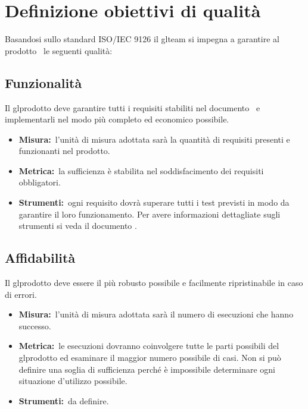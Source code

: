 
\section{Definizione obiettivi di qualità}
Basandosi sullo standard ISO/IEC 9126 il gl{team} si impegna a garantire al prodotto \PROGETTO\ le seguenti qualità:

\subsection{Funzionalità}
Il gl{prodotto} deve garantire tutti i requisiti stabiliti nel documento \ARdoc\ e implementarli nel modo più completo ed economico possibile.
\begin{itemize}
\item \textbf{Misura:}\ l'unità di misura adottata sarà la quantità di requisiti presenti e funzionanti nel prodotto.
\item \textbf{Metrica:}\ la sufficienza è stabilita nel soddisfacimento dei requisiti obbligatori.
\item \textbf{Strumenti:}\ ogni requisito dovrà superare tutti i test previsti in modo da garantire il loro funzionamento. Per avere informazioni dettagliate sugli strumenti si veda il documento \NPdoc. 
\end{itemize}

\subsection{Affidabilità}
Il gl{prodotto} deve essere il più robusto possibile e facilmente ripristinabile in caso di errori.
\begin{itemize}
\item \textbf{Misura:}\ l'unità di misura adottata sarà il numero di esecuzioni che hanno successo.
\item \textbf{Metrica:}\ le esecuzioni dovranno coinvolgere tutte le parti possibili del gl{prodotto} ed esaminare il maggior numero possibile di casi. Non si può definire una soglia di sufficienza perché è impossibile determinare ogni situazione d'utilizzo possibile.
\item \textbf{Strumenti:}\ da definire.
\end{itemize}

